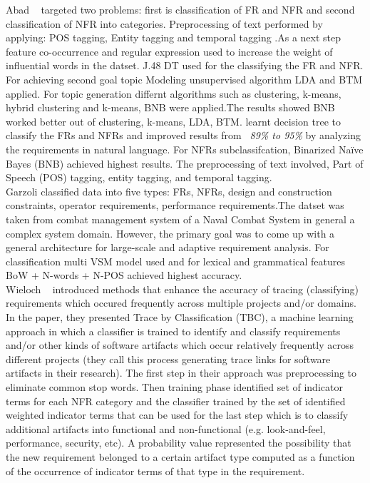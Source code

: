  Abad \etal ~ \cite{Abad:2017} targeted two problems: first is classification of
 FR and NFR and second classification of NFR into categories. Preprocessing of
 text performed by applying: POS tagging, Entity tagging and temporal tagging
 .As a next step feature co-occurrence and regular expression used to increase
 the weight of influential words in the datset. J.48 DT used for the classifying the FR and NFR. For achieving second
 goal topic Modeling unsupervised algorithm LDA and BTM applied. For topic generation differnt algorithms such as
 clustering, k-means, hybrid clustering and k-means, BNB were applied.The
 results showed BNB worked better out of clustering, k-means, LDA, BTM.
learnt decision tree to classify the FRs and NFRs and improved results from 
\emph{~89\% to 95\%} by analyzing the requirements in natural language. For NFRs
subclassifcation, Binarized Naïve Bayes (BNB) achieved highest results. The
preprocessing of text involved, Part of Speech (POS) tagging, entity tagging,
and temporal tagging.\\

Garzoli \cite {Garzoli:2013} classified data into five
types: FRs, NFRs, design and construction constraints, operator requirements,
performance requirements.The datset was taken from combat management system of a
Naval Combat System in general a complex system domain. However, the primary goal
was to come up with a general architecture for large-scale and adaptive
requirement analysis. For classification multi VSM model used and for lexical
and grammatical features BoW + N-words + N-POS achieved highest accuracy.\\

Wieloch \etal~\cite{Wieloch:2013} introduced methods that enhance the accuracy
of tracing (classifying) requirements which occured frequently across multiple
projects and/or domains. In the paper, they presented Trace by  Classification
(TBC),  a machine learning approach in which a classifier is trained to identify
and classify requirements and/or other kinds of software artifacts which occur
relatively frequently across different projects (they call this process
generating trace links for software artifacts in their research). The first step
in their approach was preprocessing to eliminate common stop words.
Then training phase identified set of indicator terms for each NFR category and the classifier trained by the set of identified
weighted indicator terms that can be used for the last step which is to
classify additional artifacts into functional and non-functional (e.g.
look-and-feel, performance, security, etc). A probability value represented the
possibility that the new requirement belonged to a certain artifact type
computed as a function of the occurrence of indicator terms of that type in the
requirement.\\

